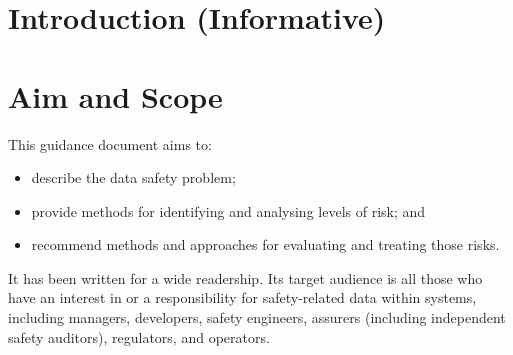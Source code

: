%
%

%
%
\setcounter{page}{1}
\pagestyle{Standard} %
\thispagestyle{FirstPage}

\chapter{Introduction (Informative)} \label{bkm:introduction}


\chapter{Aim and Scope}
This guidance document aims to:
\begin{itemize}
	\item describe the data safety problem;
	\item provide methods for identifying and analysing levels of risk; and
	\item recommend methods and approaches for evaluating and treating those risks.
\end{itemize}

It has been written for a wide readership. Its target audience is all those who have an interest in or a responsibility for safety-related data within systems, including managers, developers, safety engineers, assurers (including independent safety auditors), regulators, and operators. 

